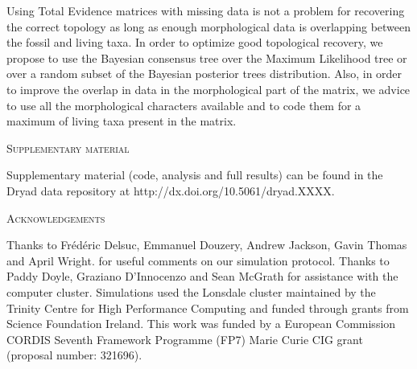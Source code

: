 \documentclass[12pt,letterpaper]{article}
\renewcommand{\section}[1]{%
\bigskip
\begin{center}
\begin{Large}
\normalfont\scshape #1
\medskip
\end{Large}
\end{center}}
\begin{document}
Using Total Evidence matrices with missing data is not a problem for recovering the correct topology as long as enough morphological data is overlapping between the fossil and living taxa. In order to optimize good topological recovery, we propose to use the Bayesian consensus tree over the Maximum Likelihood tree or over a random subset of the Bayesian posterior trees distribution. Also, in order to improve the overlap in data in the morphological part of the matrix, we advice to use all the morphological characters available and to code them for a maximum of living taxa present in the matrix.


%
%
\section{Supplementary material}
Supplementary material (code, analysis and full results) can be found in the Dryad data repository at http://dx.doi.org/10.5061/dryad.XXXX. %

\section{Acknowledgements}
Thanks to Fr\'{e}d\'{e}ric Delsuc, Emmanuel Douzery, Andrew Jackson, Gavin Thomas and April Wright. %
for useful comments on our simulation protocol.
Thanks to Paddy Doyle, Graziano D'Innocenzo and Sean McGrath for assistance with the computer cluster. Simulations used the Lonsdale cluster maintained by the Trinity Centre for High Performance Computing and funded through grants from Science Foundation Ireland. This work was funded by a European Commission CORDIS Seventh Framework Programme (FP7) Marie Curie CIG grant (proposal number: 321696).

\end{document}
